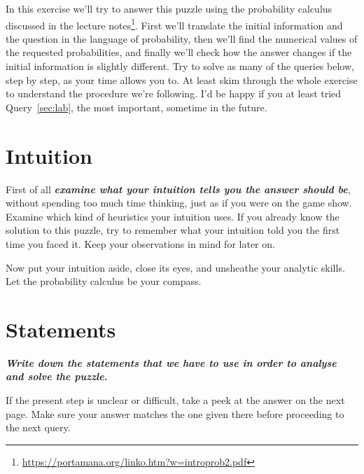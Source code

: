 \documentclass[\ifafour a4paper,12pt,\else a5paper,10pt,\fi%
onecolumn,oneside,article,%
british%
]{memoir}
\theoremstyle{remark}
\theoremstyle{innote}
\renewcommand*{\|}{\nonscript\,\vert\nonscript\;\mathopen{}}
\newcommand*{\quest}[1]{\emph{\textbf{\color{mygreen}#1}}}
\begin{document}
\medskip

In this exercise we'll try to answer this puzzle using the probability
calculus discussed in the lecture
notes\footnote{\url{https://portamana.org/linko.htm?w=introprob2.pdf}}.
First we'll translate the initial information and the question in the
language of probability, then we'll find the numerical values of the
requested probabilities, and finally we'll check how the answer changes if
the initial information is slightly different. Try to solve as many of the
queries below, step by step, as your time allows you to. At least skim
through the whole exercise to understand the procedure we're following. I'd
be happy if you at least tried Query~\ref{sec:lab}, the most important,
sometime in the future.

\bigskip

\setcounter{section}{-1}%
\section{Intuition}
\label{sec:preintuition}

First of all \quest{examine what your intuition tells you the answer should be},
without spending too much time thinking, just as if you were on the game
show. Examine which kind of heuristics your intuition uses. If you already
know the solution to this puzzle, try to remember what your intuition told
you the first time you faced it. Keep your observations in mind for later
on.

\bigskip

Now put your intuition aside, close its eyes, and unsheathe your analytic
skills. Let the probability calculus be your compass.


\section{Statements}
\label{sec:statement}



\quest{Write down the \emph{statements} that we have to use in order to analyse and
  solve the puzzle.}

\medskip

If the present step is unclear or difficult, take a peek at the answer on
the next page. Make sure your answer matches the one given there before
proceeding to the next query.

\clearpage
\end{document}
